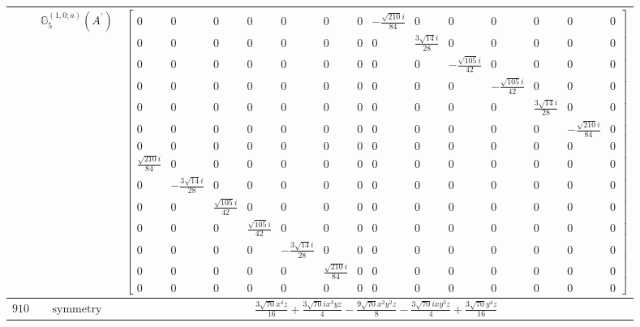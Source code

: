 \documentclass[fleqn,8pt,landscape]{jsarticle}
\begin{document}
\begin{longtable}{ccc}
$  $ & $ \mathbb{G}_{5}^{(1,0;a)}(A^{\prime}) $ & $ \begin{bmatrix} 0 & 0 & 0 & 0 & 0 & 0 & 0 & - \frac{\sqrt{210} i}{84} & 0 & 0 & 0 & 0 & 0 & 0 \\ 0 & 0 & 0 & 0 & 0 & 0 & 0 & 0 & \frac{3 \sqrt{14} i}{28} & 0 & 0 & 0 & 0 & 0 \\ 0 & 0 & 0 & 0 & 0 & 0 & 0 & 0 & 0 & - \frac{\sqrt{105} i}{42} & 0 & 0 & 0 & 0 \\ 0 & 0 & 0 & 0 & 0 & 0 & 0 & 0 & 0 & 0 & - \frac{\sqrt{105} i}{42} & 0 & 0 & 0 \\ 0 & 0 & 0 & 0 & 0 & 0 & 0 & 0 & 0 & 0 & 0 & \frac{3 \sqrt{14} i}{28} & 0 & 0 \\ 0 & 0 & 0 & 0 & 0 & 0 & 0 & 0 & 0 & 0 & 0 & 0 & - \frac{\sqrt{210} i}{84} & 0 \\ 0 & 0 & 0 & 0 & 0 & 0 & 0 & 0 & 0 & 0 & 0 & 0 & 0 & 0 \\ \frac{\sqrt{210} i}{84} & 0 & 0 & 0 & 0 & 0 & 0 & 0 & 0 & 0 & 0 & 0 & 0 & 0 \\ 0 & - \frac{3 \sqrt{14} i}{28} & 0 & 0 & 0 & 0 & 0 & 0 & 0 & 0 & 0 & 0 & 0 & 0 \\ 0 & 0 & \frac{\sqrt{105} i}{42} & 0 & 0 & 0 & 0 & 0 & 0 & 0 & 0 & 0 & 0 & 0 \\ 0 & 0 & 0 & \frac{\sqrt{105} i}{42} & 0 & 0 & 0 & 0 & 0 & 0 & 0 & 0 & 0 & 0 \\ 0 & 0 & 0 & 0 & - \frac{3 \sqrt{14} i}{28} & 0 & 0 & 0 & 0 & 0 & 0 & 0 & 0 & 0 \\ 0 & 0 & 0 & 0 & 0 & \frac{\sqrt{210} i}{84} & 0 & 0 & 0 & 0 & 0 & 0 & 0 & 0 \\ 0 & 0 & 0 & 0 & 0 & 0 & 0 & 0 & 0 & 0 & 0 & 0 & 0 & 0 \end{bmatrix} $ \\ \hline
$ 910 $ & $ \text{symmetry} $ & $ \frac{3 \sqrt{70} x^{4} z}{16} + \frac{3 \sqrt{70} i x^{3} y z}{4} - \frac{9 \sqrt{70} x^{2} y^{2} z}{8} - \frac{3 \sqrt{70} i x y^{3} z}{4} + \frac{3 \sqrt{70} y^{4} z}{16} $ \\

\end{longtable}
\end{document}
